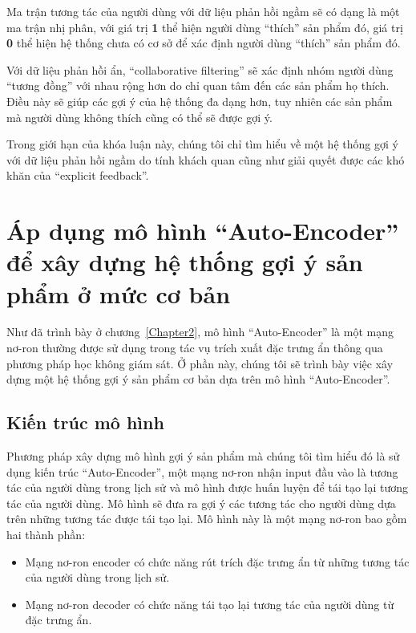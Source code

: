     Ma trận tương tác của người dùng với dữ liệu phản hồi ngầm sẽ có dạng là một ma trận nhị phân, với giá trị \textbf{1} 
    thể hiện người dùng ``thích'' sản phẩm đó, giá trị \textbf{0} thể hiện hệ thống chưa có cơ sở để xác định người dùng ``thích'' sản phẩm đó.

    Với dữ liệu phản hồi ẩn, ``collaborative filtering'' sẽ xác định nhóm người dùng ``tương đồng'' với nhau rộng hơn
    do chỉ quan tâm đến các sản phẩm họ thích. Điều này sẽ giúp các gợi ý của hệ thống 
    đa dạng hơn, tuy nhiên các sản phẩm mà người dùng không thích cũng có thể sẽ được gợi ý.

    Trong giới hạn của khóa luận này, chúng tôi chỉ tìm hiểu về một hệ thống gợi ý với dữ liệu phản hồi ngầm do tính khách quan
    cũng như giải quyết được các khó khăn của ``explicit feedback''.

\section{Áp dụng mô hình ``Auto-Encoder'' để xây dựng hệ thống gợi ý sản phẩm ở mức cơ bản}
    Như đã trình bày ở chương~\ref{Chapter2}, mô hình ``Auto-Encoder'' là một mạng nơ-ron thường được sử dụng trong tác vụ trích xuất đặc trưng ẩn thông qua phương pháp học không giám sát.
    Ở phần này, chúng tôi sẽ trình bày việc xây dựng một hệ thống gợi ý sản phẩm cơ bản dựa trên mô hình ``Auto-Encoder''.

    \subsection{Kiến trúc mô hình}
    \label{chap3/sec11}
    Phương pháp xây dựng mô hình gợi ý sản phẩm mà chúng tôi tìm hiểu đó là sử dụng kiến trúc ``Auto-Encoder'', một mạng nơ-ron nhận input đầu vào là tương tác của người dùng trong lịch sử và mô hình được huấn luyện để tái tạo lại tương tác của người dùng.
    Mô hình sẽ đưa ra gợi ý các tương tác cho người dùng dựa trên những tương tác được tái tạo lại.
    Mô hình này là một mạng nơ-ron bao gồm hai thành phần:
    \begin{itemize}
        \item Mạng nơ-ron encoder có chức năng rút trích đặc trưng ẩn từ những tương tác của người dùng trong lịch sử.
        \item Mạng nơ-ron decoder có chức năng tái tạo lại tương tác của người dùng từ đặc trưng ẩn.
    \end{itemize}

